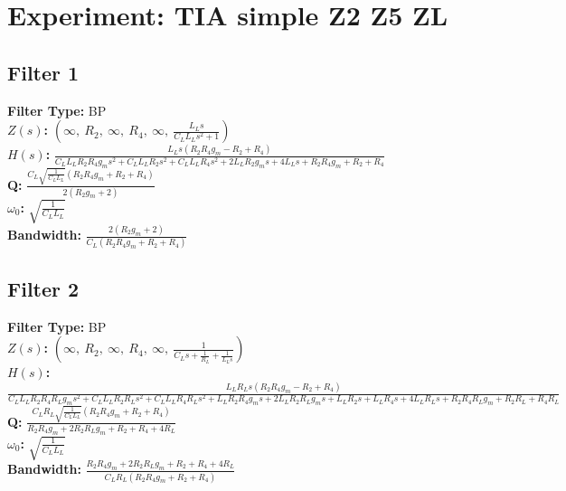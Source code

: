 \documentclass{article}
\begin{document}
        \section*{Experiment: TIA simple Z2 Z5 ZL}
\subsection*{Filter 1}
\textbf{Filter Type:} BP \\ 
\textbf{$Z(s)$:} $\left( \infty, \  R_{2}, \  \infty, \  R_{4}, \  \infty, \  \frac{L_{L} s}{C_{L} L_{L} s^{2} + 1}\right)$ \\ 
\textbf{$H(s)$:} $\frac{L_{L} s \left(R_{2} R_{4} g_{m} - R_{2} + R_{4}\right)}{C_{L} L_{L} R_{2} R_{4} g_{m} s^{2} + C_{L} L_{L} R_{2} s^{2} + C_{L} L_{L} R_{4} s^{2} + 2 L_{L} R_{2} g_{m} s + 4 L_{L} s + R_{2} R_{4} g_{m} + R_{2} + R_{4}}$ \\ 
\textbf{Q:} $\frac{C_{L} \sqrt{\frac{1}{C_{L} L_{L}}} \left(R_{2} R_{4} g_{m} + R_{2} + R_{4}\right)}{2 \left(R_{2} g_{m} + 2\right)}$ \\ 
\textbf{$\omega_0$:} $\sqrt{\frac{1}{C_{L} L_{L}}}$ \\ 
\textbf{Bandwidth:} $\frac{2 \left(R_{2} g_{m} + 2\right)}{C_{L} \left(R_{2} R_{4} g_{m} + R_{2} + R_{4}\right)}$ \\ 
\subsection*{Filter 2}
\textbf{Filter Type:} BP \\ 
\textbf{$Z(s)$:} $\left( \infty, \  R_{2}, \  \infty, \  R_{4}, \  \infty, \  \frac{1}{C_{L} s + \frac{1}{R_{L}} + \frac{1}{L_{L} s}}\right)$ \\ 
\textbf{$H(s)$:} $\frac{L_{L} R_{L} s \left(R_{2} R_{4} g_{m} - R_{2} + R_{4}\right)}{C_{L} L_{L} R_{2} R_{4} R_{L} g_{m} s^{2} + C_{L} L_{L} R_{2} R_{L} s^{2} + C_{L} L_{L} R_{4} R_{L} s^{2} + L_{L} R_{2} R_{4} g_{m} s + 2 L_{L} R_{2} R_{L} g_{m} s + L_{L} R_{2} s + L_{L} R_{4} s + 4 L_{L} R_{L} s + R_{2} R_{4} R_{L} g_{m} + R_{2} R_{L} + R_{4} R_{L}}$ \\ 
\textbf{Q:} $\frac{C_{L} R_{L} \sqrt{\frac{1}{C_{L} L_{L}}} \left(R_{2} R_{4} g_{m} + R_{2} + R_{4}\right)}{R_{2} R_{4} g_{m} + 2 R_{2} R_{L} g_{m} + R_{2} + R_{4} + 4 R_{L}}$ \\ 
\textbf{$\omega_0$:} $\sqrt{\frac{1}{C_{L} L_{L}}}$ \\ 
\textbf{Bandwidth:} $\frac{R_{2} R_{4} g_{m} + 2 R_{2} R_{L} g_{m} + R_{2} + R_{4} + 4 R_{L}}{C_{L} R_{L} \left(R_{2} R_{4} g_{m} + R_{2} + R_{4}\right)}$ \\ 
\end{document}
